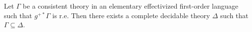 Let $\Gamma$ be a consistent theory in an elementary effectivized first-order language such that $g^{+*}\Gamma$ is r.e. Then there exists a complete decidable theory $\Delta$ such that $\Gamma \subseteq \Delta$.
